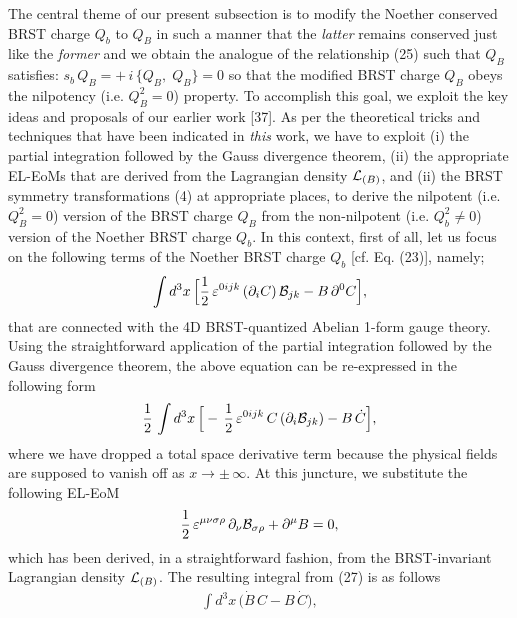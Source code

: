 \documentclass[12pt]{article}
\begin{document}
The central theme of our present subsection is to modify 
the Noether conserved BRST charge $Q_b$ to $Q_B$ in such a manner that the {\it latter} remains conserved just like the {\it former} and 
we obtain the analogue of the relationship (25) such that $Q_B$ satisfies: $s_{b} \, Q_B = +\, i\, \big \{Q_B, \; Q_B \big \} = 0$
so that the modified BRST charge $Q_B$ obeys the nilpotency (i.e. $Q_B^2 = 0$) property. To accomplish this goal, we
exploit the key ideas and proposals of our earlier work [37].
As per the theoretical tricks and techniques that have been indicated in {\it this} work, we have to exploit (i) the 
partial integration followed by the Gauss divergence theorem, (ii) the appropriate EL-EoMs that
are derived from the Lagrangian density ${\cal L}_{(B)} $, and (ii)
the BRST symmetry transformations (4) at appropriate places, to derive the nilpotent (i.e. $Q_B^2 = 0$) version of the BRST charge $Q_B$ 
from the non-nilpotent (i.e. $Q_b^2 \neq 0$) version of the Noether BRST charge $Q_b$. In this context,  first of all, let us focus on the
following terms of the Noether BRST charge $Q_b$ [cf. Eq. (23)], namely;
\begin{eqnarray}\label{26}
 \int d^3 x\, \Big [\dfrac{1}{2}\,\varepsilon^{0ijk}\, (\partial_i C)\, {\cal B}_{jk} - B \, \partial^0 C  \Big ],
\end{eqnarray}
that are connected with the 4D BRST-quantized Abelian 1-form gauge theory.
Using the straightforward application of the partial integration followed by the 
Gauss divergence theorem, the above equation can be re-expressed in the following form 
\begin{eqnarray}\label{27}
\dfrac{1}{2}\, \int d^3 x\,\Big [ -\,\dfrac{1}{2}\, \varepsilon^{0ijk}\, C\, (\partial_i {\cal B}_{jk}) - B \, \dot C \Big ],
\end{eqnarray}
where we have dropped a total space derivative term because the physical fields are supposed to vanish off as $x \to \pm\, \infty$.
At this juncture, we substitute the following EL-EoM
\begin{eqnarray}\label{28}
\dfrac{1}{2}\, \varepsilon^{\mu\nu\sigma\rho} \, \partial_\nu {\cal B}_{\sigma\rho} + \partial^\mu B = 0,
\end{eqnarray}
which has been derived, in a straightforward fashion,  from the BRST-invariant Lagrangian density ${\cal L}_{(B)} $. 
The resulting integral from (27) is as follows
\begin{eqnarray}\label{29}
 \int d^3 x\,\big (\dot B \, C - B \, \dot C \big ),
\end{eqnarray}
\end{document}
